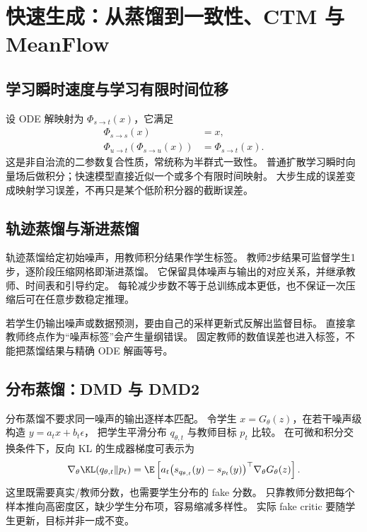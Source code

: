 \chapter{快速生成：从蒸馏到一致性、CTM 与 MeanFlow}
\label{th:fast}

\section{学习瞬时速度与学习有限时间位移}

设 ODE 解映射为 $\Phi_{s\to t}(x)$，它满足
\begin{align}
\Phi_{s\to s}(x)&=x,\\
\Phi_{u\to t}(\Phi_{s\to u}(x))&=\Phi_{s\to t}(x).
\label{th:flow-composition}
\end{align}
这是非自治流的二参数复合性质，常统称为半群式一致性。
普通扩散学习瞬时向量场后做积分；快速模型直接近似一个或多个有限时间映射。
大步生成的误差变成映射学习误差，不再只是某个低阶积分器的截断误差。

\section{轨迹蒸馏与渐进蒸馏}

轨迹蒸馏给定初始噪声，用教师积分结果作学生标签。
教师2步结果可监督学生1步，逐阶段压缩网格即渐进蒸馏。
它保留具体噪声与输出的对应关系，并继承教师、时间表和引导约定。
每轮减少步数不等于总训练成本更低，也不保证一次压缩后可在任意步数稳定推理。

若学生仍输出噪声或数据预测，要由自己的采样更新式反解出监督目标。
直接拿教师终点作为“噪声标签”会产生量纲错误。
固定教师的数值误差也进入标签，不能把蒸馏结果与精确 ODE 解画等号。

\section{分布蒸馏：DMD 与 DMD2}

分布蒸馏不要求同一噪声的输出逐样本匹配。
令学生 $x=G_\theta(z)$，在若干噪声级构造 $y=a_tx+b_t\epsilon$，
把学生平滑分布 $q_{\theta,t}$ 与教师目标 $p_t$ 比较。
在可微和积分交换条件下，反向 KL 的生成器梯度可表示为
\begin{equation}\label{th:dmd-gradient}
\nabla_\theta\KL(q_{\theta,t}\Vert p_t)
=\E\left[a_t\big(s_{q_{\theta,t}}(y)-s_{p_t}(y)\big)^\top
 \nabla_\theta G_\theta(z)\right].
\end{equation}
这里既需要真实/教师分数，也需要学生分布的 fake 分数。
只靠教师分数把每个样本推向高密度区，缺少学生分布项，容易缩减多样性。
实际 fake critic 要随学生更新，目标并非一成不变。

